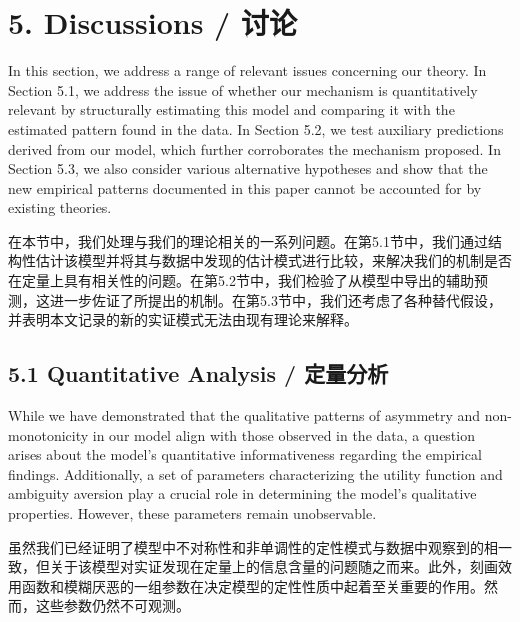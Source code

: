 \documentclass[12pt,a4paper]{article}
\newenvironment{original}
  {\par\medskip\noindent\ignorespaces}
  {\par\medskip}
\newenvironment{translation}
  {\par\noindent{\color{transblue}\ignorespaces}}
  {\par\bigskip}
\begin{document}
\section{5. Discussions / 讨论}

\begin{original}
In this section, we address a range of relevant issues concerning our theory. In Section 5.1, we address the issue of whether our mechanism is quantitatively relevant by structurally estimating this model and comparing it with the estimated pattern found in the data. In Section 5.2, we test auxiliary predictions derived from our model, which further corroborates the mechanism proposed. In Section 5.3, we also consider various alternative hypotheses and show that the new empirical patterns documented in this paper cannot be accounted for by existing theories.
\end{original}
\begin{translation}
在本节中，我们处理与我们的理论相关的一系列问题。在第5.1节中，我们通过结构性估计该模型并将其与数据中发现的估计模式进行比较，来解决我们的机制是否在定量上具有相关性的问题。在第5.2节中，我们检验了从模型中导出的辅助预测，这进一步佐证了所提出的机制。在第5.3节中，我们还考虑了各种替代假设，并表明本文记录的新的实证模式无法由现有理论来解释。
\end{translation}

\subsection{5.1 Quantitative Analysis / 定量分析}

\begin{original}
While we have demonstrated that the qualitative patterns of asymmetry and non-monotonicity in our model align with those observed in the data, a question arises about the model's quantitative informativeness regarding the empirical findings. Additionally, a set of parameters characterizing the utility function and ambiguity aversion play a crucial role in determining the model's qualitative properties. However, these parameters remain unobservable.
\end{original}
\begin{translation}
虽然我们已经证明了模型中不对称性和非单调性的定性模式与数据中观察到的相一致，但关于该模型对实证发现在定量上的信息含量的问题随之而来。此外，刻画效用函数和模糊厌恶的一组参数在决定模型的定性性质中起着至关重要的作用。然而，这些参数仍然不可观测。
\end{translation}
\end{document}
